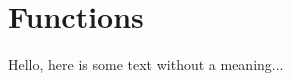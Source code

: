 \documentclass[../main.tex]{subfiles}
\begin{document}
\section{Functions}

Hello, here is some text without a meaning...
\end{document}
